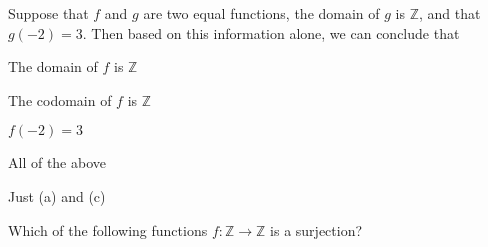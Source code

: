 \documentclass[addpoints]{exam}
\begin{document}
\begin{questions}

\question[2] Suppose that $f$ and $g$ are two equal functions, the domain of $g$ is $\mathbb{Z}$, and that $g(-2) = 3$. Then based on this information alone, we can conclude that 
	\begin{parts}
		\item The domain of $f$ is $\mathbb{Z}$
		\item The codomain of $f$ is $\mathbb{Z}$
		\item $f(-2) = 3$
		\item All of the above
		\item Just (a) and (c)
	\end{parts}



\question[2] Which of the following functions $f: \mathbb{Z} \to \mathbb{Z}$ is a surjection? 
\end{questions}
\end{document}
